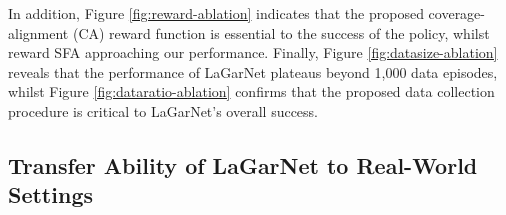 \documentclass[journal]{IEEEtran}
\begin{document}
In addition, Figure \ref{fig:reward-ablation} indicates that the proposed coverage-alignment (CA) reward function is essential to the success of the policy, whilst reward SFA approaching our performance. Finally, Figure \ref{fig:datasize-ablation} reveals that the performance of LaGarNet plateaus beyond 1,000 data episodes, whilst Figure \ref{fig:dataratio-ablation} confirms that the proposed data collection procedure is critical to LaGarNet's overall success.


\subsection{Transfer Ability of LaGarNet to Real-World Settings} \label{sec:real-exp}

\begin{table}[t!]
\caption{Real-world garment flattening performance of different pick-and-place controllers. Mesh-based planning method, VCD \cite{lin2022learning}, reports to reach \colorbox{yellow!25}{79.2 $\pm$ 9.4 \% NI} and \colorbox{yellow!25}{77.3 $\pm$ 14.1 \% NC} for real T-shirt flattening within 20 steps; its improved successor, MEDOR, reports to achieve around \colorbox{gray!25}{64\% NI} flattening for real trousers and \colorbox{gray!25}{46.8\% NI} for real dresses within 10 steps. LaGarNet shows substantial performance improvements across all garments compared to PlaNet-ClothPick, though it still falls short of human-level performance.}
\label{tab:real-worldflattening}
\centering
{}
\end{table}
\end{document}
